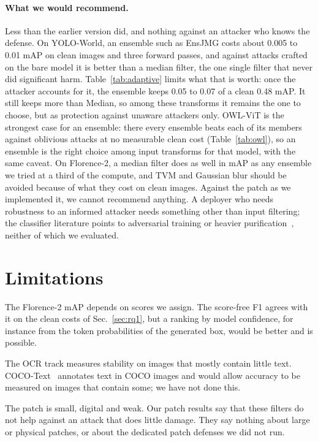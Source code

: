 \documentclass[11pt]{article}
\newcommand{\yw}{YOLO-World}
\newcommand{\fl}{Florence-2}
\begin{document}
\paragraph{What we would recommend.} Less than the earlier version did,
and nothing against an attacker who knows the defense. On \yw{}, an
ensemble such as EnsJMG costs about 0.005 to 0.01 mAP on clean images and
three forward passes, and against attacks crafted on the bare model it is
better than a median filter, the one single filter that never did
significant harm. Table~\ref{tab:adaptive} limits what that is worth: once
the attacker accounts for it, the ensemble keeps 0.05 to 0.07 of a clean
0.48 mAP. It still keeps more than Median, so among these transforms it
remains the one to choose, but as protection against unaware attackers
only. OWL-ViT is the strongest case for an ensemble: there every ensemble
beats each of its members against oblivious attacks at no measurable clean
cost (Table~\ref{tab:owl}), so an ensemble is the right choice among input
transforms for that model, with the same caveat. On \fl{}, a median filter does as well in mAP as any ensemble we tried
at a third of the compute, and TVM and Gaussian blur should be avoided
because of what they cost on clean images. Against the patch as we
implemented it, we cannot recommend anything. A deployer who needs
robustness to an informed attacker needs something other than input
filtering; the classifier literature points to adversarial training or
heavier purification~\cite{nie2022diffusion,raber2025keep}, neither of which
we evaluated.

\section{Limitations}

The \fl{} mAP depends on scores we assign. The score-free F1 agrees with it on
the clean costs of Sec.~\ref{sec:rq1}, but a ranking by model confidence, for
instance from the token probabilities of the generated box, would be better
and is possible.

The OCR track measures stability on images that mostly contain little text.
COCO-Text~\cite{veit2016cocotext} annotates text in COCO images and would
allow accuracy to be measured on images that contain some; we have not done
this.

The patch is small, digital and weak. Our patch results say that these
filters do not help against an attack that does little damage. They say
nothing about large or physical patches, or about the dedicated patch
defenses we did not run.
\end{document}
